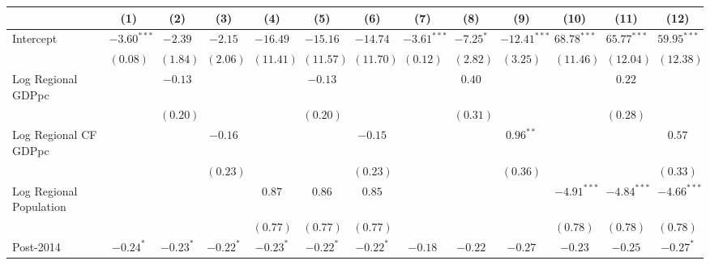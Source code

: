 
\begin{table}
\begin{center}
\begin{tiny}
\begin{tabular}{l c c c c c c c c c c c c}
\hline
 & (1) & (2) & (3) & (4) & (5) & (6) & (7) & (8) & (9) & (10) & (11) & (12) \\
\hline
Intercept                   & $-3.60^{***}$ & $-2.39$       & $-2.15$       & $-16.49$     & $-15.16$     & $-14.74$     & $-3.61^{***}$ & $-7.25^{*}$  & $-12.41^{***}$ & $68.78^{***}$ & $65.77^{***}$ & $59.95^{***}$ \\
                            & $(0.08)$      & $(1.84)$      & $(2.06)$      & $(11.41)$    & $(11.57)$    & $(11.70)$    & $(0.12)$      & $(2.82)$     & $(3.25)$       & $(11.46)$     & $(12.04)$     & $(12.38)$     \\
Log Regional GDPpc          &               & $-0.13$       &               &              & $-0.13$      &              &               & $0.40$       &                &               & $0.22$        &               \\
                            &               & $(0.20)$      &               &              & $(0.20)$     &              &               & $(0.31)$     &                &               & $(0.28)$      &               \\
Log Regional CF GDPpc       &               &               & $-0.16$       &              &              & $-0.15$      &               &              & $0.96^{**}$    &               &               & $0.57$        \\
                            &               &               & $(0.23)$      &              &              & $(0.23)$     &               &              & $(0.36)$       &               &               & $(0.33)$      \\
Log Regional Population     &               &               &               & $0.87$       & $0.86$       & $0.85$       &               &              &                & $-4.91^{***}$ & $-4.84^{***}$ & $-4.66^{***}$ \\
                            &               &               &               & $(0.77)$     & $(0.77)$     & $(0.77)$     &               &              &                & $(0.78)$      & $(0.78)$      & $(0.78)$      \\
Post-2014                   & $-0.24^{*}$   & $-0.23^{*}$   & $-0.22^{*}$   & $-0.23^{*}$  & $-0.22^{*}$  & $-0.22^{*}$  & $-0.18$       & $-0.22$      & $-0.27$        & $-0.23$       & $-0.25$       & $-0.27^{*}$   \\

\end{tabular}
\end{tiny}
\end{center}
\end{table}
